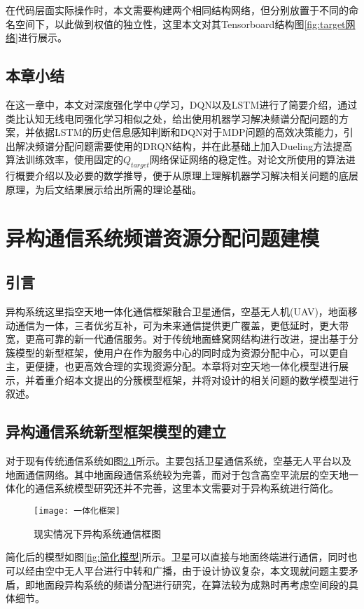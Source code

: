 在代码层面实际操作时，本文需要构建两个相同结构网络，但分别放置于不同的命名空间下，以此做到权值的独立性，这里本文对其Tensorboard结构图\ref{fig:target网络}进行展示。

\section{本章小结}
在这一章中，本文对深度强化学中\textit{Q}学习，DQN以及LSTM进行了简要介绍，通过类比认知无线电同强化学习相似之处，给出使用机器学习解决频谱分配问题的方案，并依据LSTM的历史信息感知判断和DQN对于MDP问题的高效决策能力，引出解决频谱分配问题需要使用的DRQN结构，并在此基础上加入Dueling方法提高算法训练效率，使用固定的$Q_{target}$网络保证网络的稳定性。对论文所使用的算法进行概要介绍以及必要的数学推导，便于从原理上理解机器学习解决相关问题的底层原理，为后文结果展示给出所需的理论基础。

\chapter{异构通信系统频谱资源分配问题建模}
\section{引言}
异构系统这里指空天地一体化通信框架融合卫星通信，空基无人机(UAV)，地面移动通信为一体，三者优劣互补，可为未来通信提供更广覆盖，更低延时，更大带宽，更高可靠的新一代通信服务。对于传统地面蜂窝网结构进行改进，提出基于分簇模型的新型框架，使用户在作为服务中心的同时成为资源分配中心，可以更自主，更便捷，也更高效合理的实现资源分配。本章将对空天地一体化模型进行展示，并着重介绍本文提出的分簇模型框架，并将对设计的相关问题的数学模型进行叙述。

\section{异构通信系统新型框架模型的建立}
对于现有传统通信系统如图\ref{fig:现有框架}所示。主要包括卫星通信系统，空基无人平台以及地面通信网络。其中地面段通信系统较为完善，而对于包含高空平流层的空天地一体化的通信系统模型研究还并不完善，这里本文需要对于异构系统进行简化。
\begin{figure}[h]
	\centering
	\texttt{[image: 一体化框架]}
	\caption{现实情况下异构系统通信框图}
	\label{fig:现有框架}
\end{figure}

简化后的模型如图\ref{fig:简化模型}所示。卫星可以直接与地面终端进行通信，同时也可以经由空中无人平台进行中转和广播，由于设计协议复杂，本文现就问题主要矛盾，即地面段异构系统的频谱分配进行研究，在算法较为成熟时再考虑空间段的具体细节。


